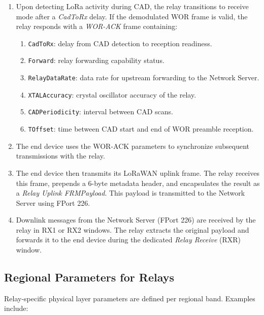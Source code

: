 \begin{enumerate}
    \item Upon detecting LoRa activity during CAD, the relay transitions to receive mode after a \emph{CadToRx} delay. If the demodulated WOR frame is valid, the relay responds with a \emph{WOR-ACK} frame containing:
          \begin{enumerate}
              \item \texttt{CadToRx}: delay from CAD detection to reception readiness.
              \item \texttt{Forward}: relay forwarding capability status.
              \item \texttt{RelayDataRate}: data rate for upstream forwarding to the Network Server.
              \item \texttt{XTALAccuracy}: crystal oscillator accuracy of the relay.
              \item \texttt{CADPeriodicity}: interval between CAD scans.
              \item \texttt{TOffset}: time between CAD start and end of WOR preamble reception.
          \end{enumerate}

    \item The end device uses the WOR-ACK parameters to synchronize subsequent transmissions with the relay.

    \item The end device then transmits its LoRaWAN uplink frame. The relay receives this frame, prepends a 6-byte metadata header, and encapsulates the result as a \emph{Relay Uplink FRMPayload}. This payload is transmitted to the Network Server using FPort 226.

    \item Downlink messages from the Network Server (FPort 226) are received by the relay in RX1 or RX2 windows. The relay extracts the original payload and forwards it to the end device during the dedicated \emph{Relay Receive} (RXR) window.
\end{enumerate}

\subsection{Regional Parameters for Relays}

Relay-specific physical layer parameters are defined per regional band. Examples include:

